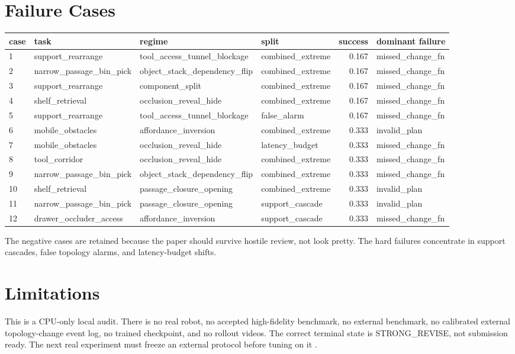 \documentclass{article}
\begin{document}
\section{Failure Cases}
\begingroup
\scriptsize
\setlength{\tabcolsep}{3pt}
\begin{tabular}{llllrl}
\toprule
case & task & regime & split & success & dominant failure\\
\midrule
1 & support\_rearrange & tool\_access\_tunnel\_blockage & combined\_extreme & 0.167 & missed\_change\_fn \\
2 & narrow\_passage\_bin\_pick & object\_stack\_dependency\_flip & combined\_extreme & 0.167 & missed\_change\_fn \\
3 & support\_rearrange & component\_split & combined\_extreme & 0.167 & missed\_change\_fn \\
4 & shelf\_retrieval & occlusion\_reveal\_hide & combined\_extreme & 0.167 & missed\_change\_fn \\
5 & support\_rearrange & tool\_access\_tunnel\_blockage & false\_alarm & 0.167 & missed\_change\_fn \\
6 & mobile\_obstacles & affordance\_inversion & combined\_extreme & 0.333 & invalid\_plan \\
7 & mobile\_obstacles & occlusion\_reveal\_hide & latency\_budget & 0.333 & missed\_change\_fn \\
8 & tool\_corridor & occlusion\_reveal\_hide & combined\_extreme & 0.333 & missed\_change\_fn \\
9 & narrow\_passage\_bin\_pick & object\_stack\_dependency\_flip & combined\_extreme & 0.333 & missed\_change\_fn \\
10 & shelf\_retrieval & passage\_closure\_opening & combined\_extreme & 0.333 & invalid\_plan \\
11 & narrow\_passage\_bin\_pick & passage\_closure\_opening & support\_cascade & 0.333 & invalid\_plan \\
12 & drawer\_occluder\_access & affordance\_inversion & support\_cascade & 0.333 & missed\_change\_fn \\
\bottomrule
\end{tabular}
\endgroup

The negative cases are retained because the paper should survive hostile review, not look pretty. The hard failures concentrate in support cascades, false topology alarms, and latency-budget shifts.

\section{Limitations}
This is a CPU-only local audit. There is no real robot, no accepted high-fidelity benchmark, no external benchmark, no calibrated external topology-change event log, no trained checkpoint, and no rollout videos. The correct terminal state is STRONG\_REVISE, not submission ready. The next real experiment must freeze an external protocol before tuning on it \citep{murlidaran2025eye33,yan2025intelligent34,dematti2025realtime35,dematti2025realtime36,li2026a37,huang2024citypulse38,simeonov2026realtime39,rong2024driving40,maham2025deep41,zhang2026grasping42}.
\end{document}
